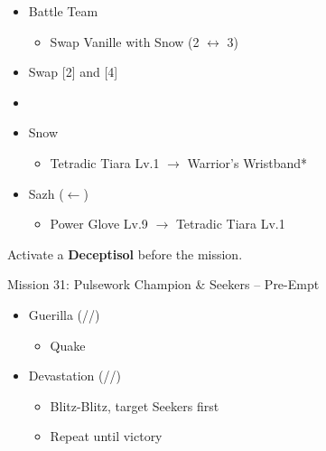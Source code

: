 \begin{menu}
	\begin{itemize}
	\paradigm
		\begin{itemize}
			\item Battle Team
				\begin{itemize}
					\item Swap Vanille with Snow (2 $\leftrightarrow$ 3)
				\end{itemize}
			\item Swap [2] and [4]
			\item {}%
				{\paradigmline{\com}{\com}{\med}}%
				{\paradigmline{\com}{\com}{\sab}}%
				{\paradigmline{\syn}{\sen}{\med}}%
				{\paradigmline[4]{(\syn)}{(\rav)}{(\sab)}}%
				{\paradigmline{\com}{\sen}{\sab}}%
				{\paradigmline{\rav}{\rav}{\sab}}%
		\end{itemize}
	\equip
		\begin{itemize}
			\item Snow
				\begin{itemize}
					\item Tetradic Tiara Lv.1 $\rightarrow$ Warrior's Wristband*
				\end{itemize}			
			\item Sazh ($\leftarrow$)
				\begin{itemize}
					\item Power Glove Lv.9 $\rightarrow$ Tetradic Tiara Lv.1
				\end{itemize}			
		\end{itemize}
	\end{itemize}
\end{menu}


\renewcommand{\first}{[1] Tireless Charge (\com/\com/\med)}
\renewcommand{\second}{[2] Devastation (\com/\com/\sab)}
\renewcommand{\third}{[3] Protection (\syn/\sen/\med)}
\renewcommand{\fourth}{[4] Guerilla (\syn/\rav/\sab)}
\renewcommand{\fifth}{[5] Dirty Fighting (\com/\sen/\sab)}
\renewcommand{\sixth}{[6] Smart Bomb (\rav/\rav/\sab)}

Activate a \textbf{Deceptisol} before the mission.

\begin{battle}{Mission 31: Pulsework Champion \& Seekers -- Pre-Empt}
	\begin{itemize}
		\item \fourth
			\begin{itemize}
				\item Quake
			\end{itemize}
		\item \second
			\begin{itemize}
				\item Blitz-Blitz, target Seekers first
				\item Repeat until victory
			\end{itemize}
	\end{itemize}
\end{battle}

